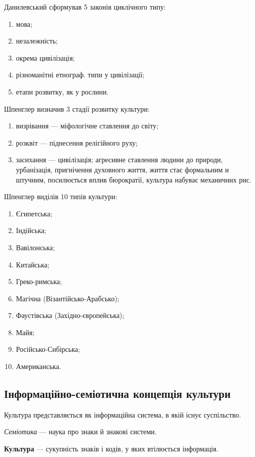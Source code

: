 \documentclass[a5paper,10pt,titlepage,pdftex,headsepline]{scrartcl}
\begin{document}
Данилевський сформував 5 законів циклічного типу:
\begin{enumerate}
\item мова;
\item незалежність;
\item окрема цивілізація;
\item різноманітні етнограф. типи у цивілізації;
\item етапи розвитку, як у рослини.
\end{enumerate}

Шпенглер визначив 3 стадії розвитку культури:
\begin{enumerate}
\item визрівання --- міфологічне ставлення до світу;
\item розквіт --- піднесення релігійного руху;
\item засихання --- цивілізація; агресивне ставлення людини до природи, урбанізація, пригнічення духовного життя, життя стає формальним и штучним, посилюється вплив бюрократії, культура набуває механичних рис.
\end{enumerate}

Шпенглер виділів 10 типів культури:
\begin{enumerate}
  \item Єгипетська;
  \item Індійська;
  \item Вавілонська;
  \item Китайська;
  \item Греко-римська;
  \item Магічна (Візантійсько-Арабсько);
  \item Фаустівська (Західно-європейська);
  \item Майя;
  \item Російсько-Сибірська;
  \item Американська.
\end{enumerate}

\subsection{Інформаційно-семіотична концепція культури}
Культура представляється як інформаційна система, в якій існує суспільство.

\textit{Семіотика} --- наука про знаки й знакові системи.

\textbf{Культура} --- сукупність знаків і кодів, у яких втілюється інформація.
\end{document}
